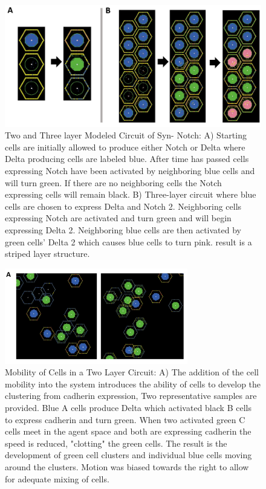 \documentclass[12pt]{ifacconf}
\begin{document}
\begin{figure}
\begin{center}
\includegraphics[width=\textwidth]{Two_and_Three_layer_Two_Genotype} %
\caption{Two and Three layer Modeled Circuit of Syn- Notch: A) Starting cells are initially allowed to produce either Notch or Delta where Delta producing cells are labeled blue. After time has passed cells expressing Notch have been activated by neighboring blue cells and will turn green. If there are no neighboring cells the Notch expressing cells will remain black. B) Three-layer circuit where blue cells are chosen to express Delta and Notch 2. Neighboring cells expressing Notch are activated and turn green and will begin expressing Delta 2. Neighboring blue cells are then activated by green cells' Delta 2 which causes blue cells to turn pink. result is a striped layer structure. } 
\label{fig:bifurcation}
\end{center}
\end{figure}

\begin{figure}
\begin{center}
\includegraphics[width=8.0cm]{Mobility_Two_layer} %
\caption{Mobility of Cells in a Two Layer Circuit: A) The addition of the cell mobility into the system introduces the ability of cells to develop the clustering from cadherin expression, Two representative samples are provided. Blue A cells produce Delta which activated black B cells to express cadherin and turn green. When two activated green C cells meet in the agent space and both are expressing cadherin the speed is reduced, "clotting" the green cells. The result is the development of green cell clusters and individual blue cells moving around the clusters. Motion was biased towards the right to allow for adequate mixing of cells. } 
\label{fig:bifurcation}
\end{center}
\end{figure}
\end{document}
